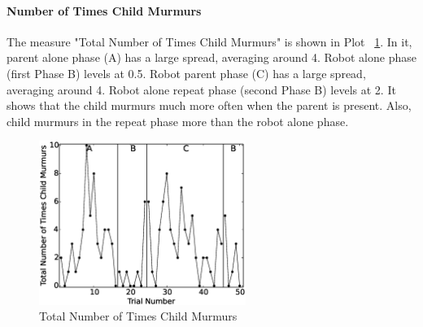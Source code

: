 \documentclass{ut-thesis}
\begin{document}
\paragraph{Number of Times Child Murmurs}
The measure "Total Number of Times Child Murmurs" is shown in Plot \ \ref{fig:13TotalNumberofTimesChildMurmurs}.  In it, parent alone phase (A) has a large spread, averaging around 4.  Robot alone phase (first Phase B) levels at 0.5.  Robot parent phase (C) has a large spread, averaging around 4.  Robot alone repeat phase (second Phase B) levels at 2.  It shows that the child murmurs much more often when the parent is present.  Also, child murmurs in the repeat phase more than the robot alone phase.
\begin{figure} [h]
	\centering
	\includegraphics[width=0.6\textwidth]{./img/data_analysis/13TotalNumberofTimesChildMurmurs.eps}
	\caption{Total Number of Times Child Murmurs}
	\label{fig:13TotalNumberofTimesChildMurmurs}
\end{figure}
\end{document}
